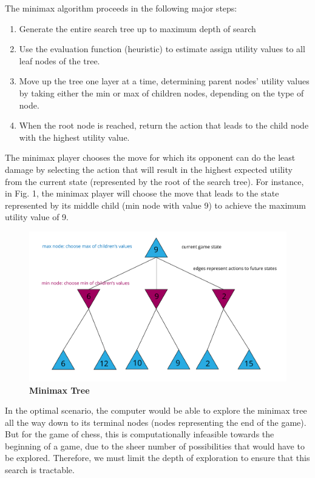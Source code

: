 \documentclass{article}
\begin{document}
The minimax algorithm proceeds in the following major steps:

\begin{enumerate}
\item Generate the entire search tree up to maximum depth of search
\item Use the evaluation function (heuristic) to estimate assign utility values to all leaf nodes of the tree.
\item Move up the tree one layer at a time, determining parent nodes' utility values by taking either the min or max of children nodes, depending on the type of node.
\item When the root node is reached, return the action that leads to the child node with the highest utility value.
\end{enumerate}

The minimax player chooses the move for which its opponent can do the least damage by selecting the action that will result in the highest expected utility from the current state (represented by the root of the search tree). For instance, in Fig. 1, the minimax player will choose the move that leads to the state represented by its middle child (min node with value 9) to achieve the maximum utility value of 9.

\begin{figure}[!htb]
\centering
\includegraphics[scale=0.6]{minimaxtree.pdf}
\caption{{\bf Minimax Tree}}
\end{figure}

In the optimal scenario, the computer would be able to explore the minimax tree all the way down to its terminal nodes (nodes representing the end of the game). But for the game of chess, this is computationally infeasible towards the beginning of a game, due to the sheer number of possibilities that would have to be explored. Therefore, we must limit the depth of exploration to ensure that this search is tractable.
\end{document}
